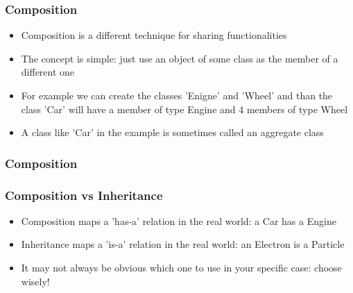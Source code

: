 \documentclass[9pt]{beamer}
\begin{document}
\begin{frame}
  \frametitle{Composition}
    
  \begin{itemize}
    \item \alert{Composition} is a different technique for sharing functionalities
    \medskip
    \item The concept is simple: just use an object of some class as the member of a different one
    \medskip
    \item For example we can create the classes 'Enigne' and 'Wheel' and than the class 'Car' will have
          a member of type Engine and 4 members of type Wheel
    \medskip
    \item A class like 'Car' in the example is sometimes called an \alert{aggregate} class
  \end{itemize}
  
\end{frame}


\begin{frame}
  \frametitle{Composition}
  
\end{frame}


\begin{frame}
  \frametitle{Composition vs Inheritance}
    
  \begin{itemize}
    \item Composition maps a 'has-a' relation in the real world: a Car has a Engine
    \medskip
    \item Inheritance maps a 'is-a' relation in the real world: an Electron is a Particle
    \medskip
    \item It may not always be obvious which one to use in your specific case: choose wisely!
  \end{itemize}
  
\end{frame}
\end{document}
